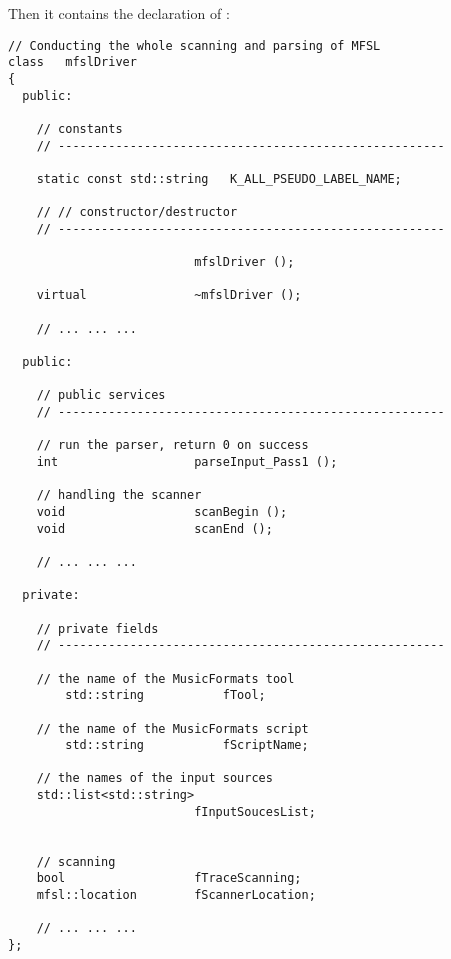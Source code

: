 Then it contains the declaration of :
\begin{lstlisting}[language=CPlusPlus]
// Conducting the whole scanning and parsing of MFSL
class   mfslDriver
{
  public:

    // constants
    // ------------------------------------------------------

    static const std::string   K_ALL_PSEUDO_LABEL_NAME;

    // // constructor/destructor
    // ------------------------------------------------------

                          mfslDriver ();

    virtual               ~mfslDriver ();

	// ... ... ...

  public:

    // public services
    // ------------------------------------------------------

    // run the parser, return 0 on success
    int                   parseInput_Pass1 ();

    // handling the scanner
    void                  scanBegin ();
    void                  scanEnd ();

	// ... ... ...

  private:

    // private fields
    // ------------------------------------------------------

    // the name of the MusicFormats tool
		std::string           fTool;

    // the name of the MusicFormats script
		std::string           fScriptName;

    // the names of the input sources
    std::list<std::string>          
                          fInputSoucesList;


    // scanning
    bool                  fTraceScanning;
    mfsl::location        fScannerLocation;

	// ... ... ...
};
\end{lstlisting}

